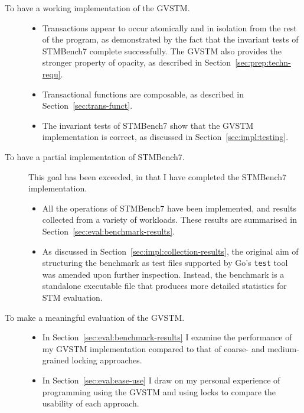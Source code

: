 \documentclass[12pt,a4paper,oneside,openright]{report}
\begin{document}
\begin{description}
\item[To have a working implementation of the GVSTM.] \hfill
  \begin{itemize}
  \item Transactions appear to occur atomically and in isolation from
    the rest of the program, as demonstrated by the fact that the
    invariant tests of STMBench7 complete successfully. The GVSTM also
    provides the stronger property of opacity, as described in
    Section~\ref{sec:prep:techn-requ}.
  \item Transactional functions are composable, as described in
    Section~\ref{sec:trans-funct}.
  \item The invariant tests of STMBench7 show that the GVSTM
    implementation is correct, as discussed in
    Section~\ref{sec:impl:testing}.
  \end{itemize}
\item[To have a partial implementation of STMBench7.] This goal has
  been exceeded, in that I have completed the STMBench7
  implementation.
  \begin{itemize}
  \item All the operations of STMBench7 have been implemented, and
    results collected from a variety of workloads. These results are
    summarised in Section~\ref{sec:eval:benchmark-results}.
  \item As discussed in Section~\ref{sec:impl:collection-results}, the
    original aim of structuring the benchmark as test files supported
    by Go's \texttt{test} tool was amended upon further
    inspection. Instead, the benchmark is a standalone executable file
    that produces more detailed statistics for STM evaluation.
  \end{itemize}
\item[To make a meaningful evaluation of the GVSTM.] \hfill
  \begin{itemize}
  \item In Section~\ref{sec:eval:benchmark-results} I examine the
    performance of my GVSTM implementation compared to that of coarse-
    and medium-grained locking approaches.
  \item In Section~\ref{sec:eval:ease-use} I draw on my personal
    experience of programming using the GVSTM and using locks to
    compare the usability of each approach.
  \end{itemize}
\end{description}
\end{document}
